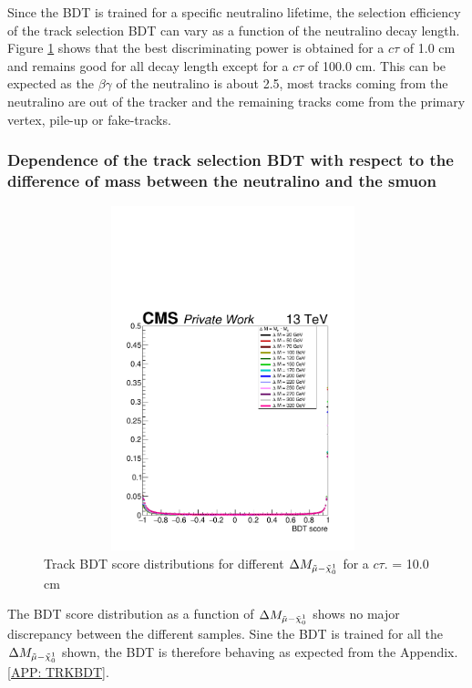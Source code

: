 \documentclass{cernatlasnote}
\begin{document}
\FloatBarrier
Since the BDT is trained for a specific neutralino lifetime, the selection efficiency of the track selection BDT can vary as a function of the neutralino decay length. Figure \ref{fig:BDTctau} shows that the best discriminating power is obtained for a $c\tau$ of 1.0 cm and remains good for all decay length except for a $c\tau$ of 100.0 cm. This can be expected as the $\beta\gamma$ of the neutralino is about 2.5, most tracks coming from the neutralino are out of the tracker and the remaining tracks come from the primary vertex, pile-up or fake-tracks.

\subsubsection{Dependence of the track selection BDT with respect to the difference of mass between the neutralino and the smuon}
   \begin{figure}[ht]
\centering
\includegraphics[height=10cm, width=11cm, trim= 0cm 0cm 0cm 0cm,clip]{images/BDT/plotBDTTRK_dm.pdf}
\caption{\label{fig:BDTctau} Track BDT score distributions for different $\Delta M_{\Tilde{\mu}-\Tilde{\chi}^{1}_{0}}$ for a $c\tau$. = 10.0 cm }
\end{figure}

The BDT score distribution as a function of $\Delta M_{\Tilde{\mu}-\Tilde{\chi}^{1}_{0}}$  shows no major discrepancy between the different samples. Sine the BDT is trained for all the $\Delta M_{\Tilde{\mu}-\Tilde{\chi}^{1}_{0}}$ shown, the BDT is therefore behaving as expected from the Appendix.\ref{APP: TRKBDT}.
\end{document}
